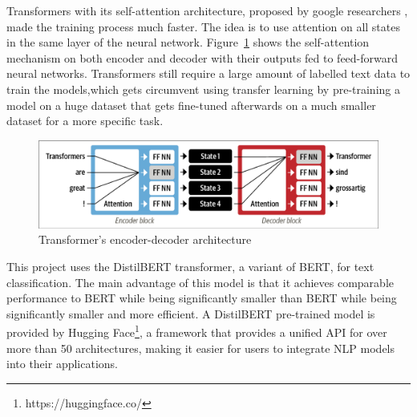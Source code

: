 Transformers with its self-attention architecture, proposed by google researchers
\cite{vaswaniAttentionAllYou2017}, made the training process much faster. The idea is to use
attention on all states in the same layer of the neural network.
Figure~\ref{fig:encoder_decoder_transformer} shows the self-attention mechanism on both encoder
and decoder with their outputs fed to feed-forward neural networks. Transformers still require a
large amount of labelled text data to train the models,which gets circumvent using transfer learning
by pre-training a model on a huge dataset that gets fine-tuned afterwards on a much smaller dataset
for a more specific task.

\begin{figure}[H]
\begin{center}
  \includegraphics[width=\columnwidth, trim={0.1cm 0.1cm 0.1cm 0.1cm},clip]{./images/encoder-decoder_transformer.png}
\end{center}
\caption{Transformer's encoder-decoder architecture \cite{tunstallNaturalLanguageProcessing2022}}
\label{fig:encoder_decoder_transformer}
\end{figure}

This project uses the DistilBERT transformer\cite{Sanh2019DistilBERTAD}, a variant of BERT, for text
classification.  The main advantage of this model is that it achieves comparable performance to BERT
while being significantly smaller than BERT while being significantly smaller and more efficient. A
DistilBERT pre-trained model is provided by Hugging Face\footnote{https://huggingface.co/}, a
framework that provides a unified API for over more than 50 architectures, making it easier for
users to integrate \ac{NLP} models into their applications.

